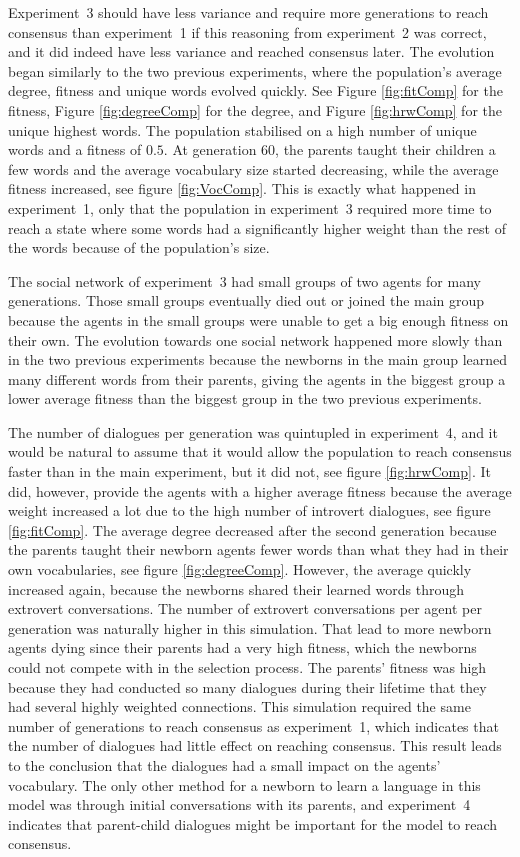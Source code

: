 Experiment~3 should have less variance and require more generations to reach consensus than experiment~1 if this reasoning from experiment~2 was correct, and it did indeed have less variance and reached consensus later. The evolution began similarly to the two previous experiments, where the population's average degree, fitness and unique words evolved quickly. See Figure \ref{fig:fitComp} for the fitness, Figure \ref{fig:degreeComp} for the degree, and Figure \ref{fig:hrwComp} for the unique highest words. The population stabilised on a high number of unique words and a fitness of $0.5$. At generation $60$, the parents taught their children a few words and the average vocabulary size started decreasing, while the average fitness increased, see figure \ref{fig:VocComp}. This is exactly what happened in experiment~1, only that the population in experiment~3 required more time to reach a state where some words had a significantly higher weight than the rest of the words because of the population’s size. 

The social network of experiment~3 had small groups of two agents for many generations. Those small groups eventually died out or joined the main group because the agents in the small groups were unable to get a big enough fitness on their own. The evolution towards one social network happened more slowly than in the two previous experiments because the newborns in the main group learned many different words from their parents, giving the agents in the biggest group a lower average fitness than the biggest group in the two previous experiments.

The number of dialogues per generation was quintupled in experiment~4, and it would be natural to assume that it would allow the population to reach consensus faster than in the main experiment, but it did not, see figure \ref{fig:hrwComp}. It did, however, provide the agents with a higher average fitness because the average weight increased a lot due to the high number of introvert dialogues, see figure \ref{fig:fitComp}. The average degree decreased after the second generation because the parents taught their newborn agents fewer words than what they had in their own vocabularies, see figure \ref{fig:degreeComp}. However, the average quickly increased again, because the newborns shared their learned words through extrovert conversations. The number of extrovert conversations per agent per generation was naturally higher in this simulation. That lead to more newborn agents dying since their parents had a very high fitness, which the newborns could not compete with in the selection process. The parents' fitness was high because they had conducted so many dialogues during their lifetime that they had several highly weighted connections. This simulation required the same number of generations to reach consensus as experiment~1, which indicates that the number of dialogues had little effect on reaching consensus. This result leads to the conclusion that the dialogues had a small impact on the agents' vocabulary. The only other method for a newborn to learn a language in this model was through initial conversations with its parents, and experiment~4 indicates that parent-child dialogues might be important for the model to reach consensus.  

